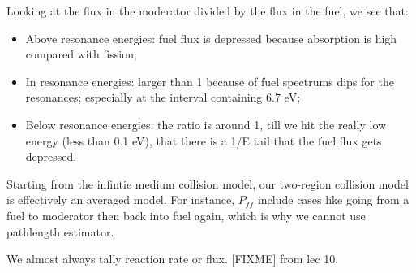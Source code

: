 \documentclass{school-22.211-notes}
\begin{document}
Looking at the flux in the moderator divided by the flux in the fuel, we see that:
\begin{itemize}
\item Above resonance energies: fuel flux is depressed because absorption is high compared with fission; 
\item In resonance energies: larger than 1 because of fuel spectrums dips for the resonances; especially at the interval containing 6.7 eV;
\item Below resonance energies: the ratio is around 1, till we hit the really low energy (less than 0.1 eV), that there is a 1/E tail that the fuel flux gets depressed. 
\end{itemize}

Starting from the infintie medium collision model, our two-region collision model is effectively an averaged model. For instance, $P_{ff}$ include cases like going from a fuel to moderator then back into fuel again, which is why we cannot use pathlength estimator. 

We almost always tally reaction rate or flux. 
[FIXME] from lec 10.
\end{document}
